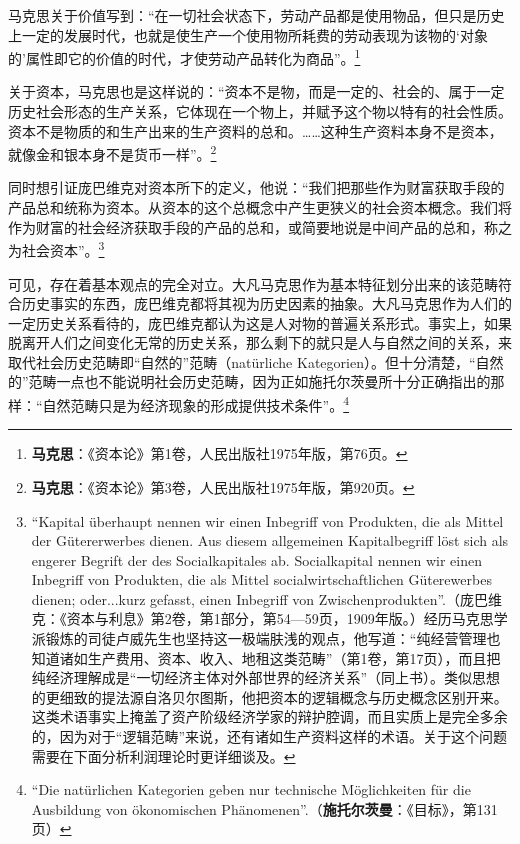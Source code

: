 \documentclass[fontset=fandol, a4paper, 12pt, openright]{ctexbook}
\begin{document}
马克思关于价值写到：“在一切社会状态下，劳动产品都是使用物品，但只是历史上一定的发展时代，也就是使生产一个使用物所耗费的劳动表现为该物的‘对象的’属性即它的价值的时代，才使劳动产品转化为商品”。\footnote{\textbf{马克思}：《资本论》第1卷，人民出版社1975年版，第76页。}

关于资本，马克思也是这样说的：“资本不是物，而是一定的、社会的、属于一定历史社会形态的生产关系，它体现在一个物上，并赋予这个物以特有的社会性质。资本不是物质的和生产出来的生产资料的总和。……这种生产资料本身不是资本，就像金和银本身不是货币一样”。\footnote{\textbf{马克思}：《资本论》第3卷，人民出版社1975年版，第920页。}

同时想引证庞巴维克对资本所下的定义，他说：“我们把那些作为财富获取手段的产品总和统称为资本。从资本的这个总概念中产生更狭义的社会资本概念。我们将作为财富的社会经济获取手段的产品的总和，或简要地说是中间产品的总和，称之为社会资本”。\footnote{``Kapital \"{u}berhaupt nennen wir einen Inbegriff von Produkten, die als Mittel der G\"{u}tererwerbes dienen. Aus diesem allgemeinen Kapitalbegriff l\"{o}st sich als engerer Begrift der des Socialkapitales ab. Socialkapital nennen wir einen Inbegriff von Produkten, die als Mittel socialwirtschaftlichen G\"{u}terewerbes dienen; oder...kurz gefasst, einen Inbegriff von Zwischenprodukten''.（庞巴维克：《资本与利息》第2卷，第1部分，第54—59页，1909年版。）经历马克思学派锻炼的司徒卢威先生也坚持这一极端肤浅的观点，他写道：“纯经营管理也知道诸如生产费用、资本、收入、地租这类范畴”（第1卷，第17页），而且把纯经济理解成是“一切经济主体对外部世界的经济关系”（同上书）。类似思想的更细致的提法源自洛贝尔图斯，他把资本的逻辑概念与历史概念区别开来。这类术语事实上掩盖了资产阶级经济学家的辩护腔调，而且实质上是完全多余的，因为对于“逻辑范畴”来说，还有诸如生产资料这样的术语。关于这个问题需要在下面分析利润理论时更详细谈及。}

可见，存在着基本观点的完全对立。大凡马克思作为基本特征划分出来的该范畴符合历史事实的东西，庞巴维克都将其视为历史因素的抽象。大凡马克思作为人们的一定历史关系看待的，庞巴维克都认为这是人对物的普遍关系形式。事实上，如果脱离开人们之间变化无常的历史关系，那么剩下的就只是人与自然之间的关系，来取代社会历史范畴即“自然的”范畴（nat\"{u}rliche Kategorien）。但十分清楚，“自然的”范畴一点也不能说明社会历史范畴，因为正如施托尔茨曼所十分正确指出的那样：“自然范畴只是为经济现象的形成提供技术条件”。\footnote{``Die nat\"{u}rlichen Kategorien geben nur technische M\"{o}glichkeiten f\"{u}r die Ausbildung von \"{o}konomischen Ph\"{a}nomenen''.（\textbf{施托尔茨曼}：《目标》，第131页）}
\end{document}
